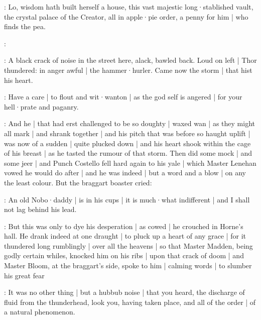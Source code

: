 \stephen:
Lo,
wisdom hath built herself a house,
this vast majestic long·stablished vault,
the crystal palace of the Creator,
all in apple·pie order,
a penny for him |
who finds the pea.

\stephen:




:
A black crack of noise in the street here,
alack,
bawled back.
Loud on left |
Thor thundered:
in anger awful |
the hammer·hurler.
Came now the storm |
that hist his heart.

\lynch:
Have a care |
to flout and wit·wanton |
as the god self is angered |
for your hell·prate and paganry.

:
And he |
that had erst challenged to be so doughty |
waxed wan |
as they might all mark |
and shrank together |
and his pitch that was before so haught uplift |
was now of a sudden |
quite plucked down |
and his heart shook within the cage of his breast |
as he tasted the rumour of that storm.
Then did some mock |
and some jeer |
and Punch Costello fell hard again to his yale |
which Master Lenehan vowed he would do after |
and he was indeed |
but a word and a blow |
on any the least colour.
But the braggart boaster cried:

\stephen:
An old Nobo·daddy |
is in his cups |
it is much·what indifferent |
and I shall not lag behind his lead.

:
But this was only to dye his desperation |
as cowed |
he crouched in Horne's hall.
He drank indeed at one draught |
to pluck up a heart of any grace |
for it thundered long rumblingly |
over all the heavens |
so that Master Madden,
being godly certain whiles,
knocked him on his ribs |
upon that crack of doom |
and Master Bloom,
at the braggart's side,
spoke to him |
calming words |
to slumber his great fear

\Bloom:
It was no other thing |
but a hubbub noise |
that you heard,
the discharge of fluid from the thunderhead,
look you,
having taken place,
and all of the order |
of a natural phenomenon.



